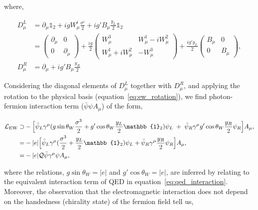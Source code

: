 \noindent
where,

\begin{equation}
\begin{split}
    D^L_\mu &= \partial_\mu \mathbb{1}_2 + igW^i_\mu \frac{\sigma^i}{2} + ig'B_\mu \frac{y_L}{2} \mathbb{1}_2 
    \\
    &= \begin{pmatrix}
    \partial_\mu & 0 \\
    0 & \partial_\mu
    \end{pmatrix} + \frac{ig}{2}\begin{pmatrix}
    W^3_\mu & W^1_\mu-iW^2_\mu \\
    W^1_\mu+iW^2_\mu & -W^3_\mu
    \end{pmatrix} + \frac{ig'y_L}{2}\begin{pmatrix}
    B_\mu & 0 \\
    0 & B_\mu
    \end{pmatrix},
    \\
    D^R_\mu &= \partial_\mu + ig'B_\mu \frac{y_R}{2}
\end{split}
\end{equation}

\noindent
Considering the diagonal elements of $D^L_\mu$ together with $D^R_\mu$, and applying the rotation to the physical basis (equation~\ref{eq:ew_rotation}), we find photon-fermion interaction term ($\bar{\psi}\psi A_\mu$) of the form,

\begin{equation}
\begin{split}
    \mathcal{L}_{\rm{EW}} \supset &-\Big[ \bar{\psi}_L \gamma^\mu(g\sin{\theta_W} \frac{\sigma^3}{2} + g'\cos{\theta_W} \frac{y_L}{2} \mathbb{1}_2)\psi_L \; + \; \bar{\psi}_R\gamma^\mu g'\cos{\theta_W}\frac{y_R}{2}\psi_R \Big]A_\mu,
    \\
    = &-|e|\Big[ \bar{\psi}_L \gamma^\mu (\frac{\sigma^3}{2}+\frac{y_L}{2} \mathbb{1}_2)\psi_L + \bar{\psi}_R\gamma^\mu \frac{y_R}{2}\psi_R \Big]A_\mu,
    \\
    = & - |e|\mathcal{Q} \bar{\psi} \gamma^\mu \psi A_\mu,
\end{split}
\end{equation}

\noindent
where the relations, $g\sin{\theta_W}=|e|$ and $g'\cos{\theta_W}=|e|$, are inferred by relating to the equivalent interaction term of QED in equation~\ref{eq:qed_interaction}. Moreover, the observation that the electromagnetic interaction does not depend on the handedness (chirality state) of the fermion field tell us,


